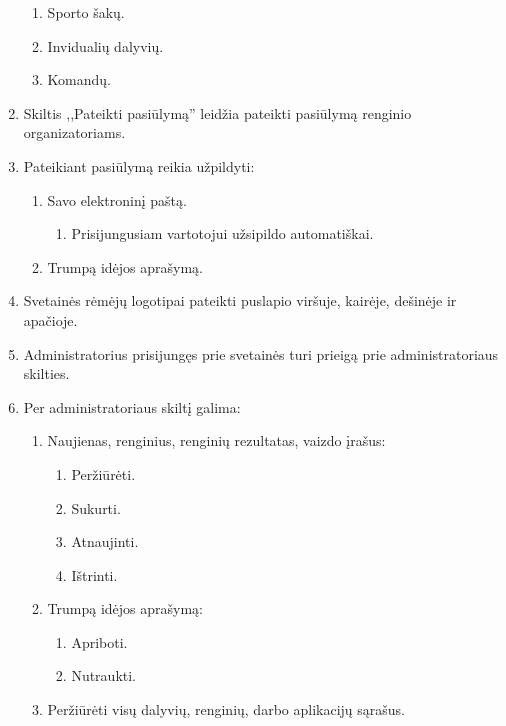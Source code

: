 \documentclass{VUMIFPSkursinis}
\begin{document}
\begin{enumerate}[label=\textbf{FR\arabic*}]
\begin{enumerate}[label*=\textbf{.\arabic*}]
						\item Sporto šakų.
						\item Invidualių dalyvių.
						\item Komandų.
					\end{enumerate}
				\item Skiltis ,,Pateikti pasiūlymą'' leidžia pateikti pasiūlymą renginio organizatoriams.
				\item Pateikiant pasiūlymą reikia užpildyti:
					\begin{enumerate}[label*=\textbf{.\arabic*}]
						\item Savo elektroninį paštą.
						    \begin{enumerate}[label*=\textbf{.\arabic*}]
						        \item Prisijungusiam vartotojui užsipildo automatiškai.
						    \end{enumerate}
						\item Trumpą idėjos aprašymą.
					\end{enumerate}
				\item Svetainės rėmėjų logotipai pateikti puslapio viršuje, kairėje, dešinėje ir apačioje.
				\item Administratorius prisijungęs prie svetainės turi prieigą prie administratoriaus skilties.
				\item Per administratoriaus skiltį galima:
					\begin{enumerate}[label*=\textbf{.\arabic*}]
						\item Naujienas, renginius, renginių rezultatas, vaizdo įrašus:
						    \begin{enumerate}[label*=\textbf{.\arabic*}]
						        \item Peržiūrėti.
						        \item Sukurti.
						        \item Atnaujinti.
						        \item Ištrinti.
						    \end{enumerate}
						\item Trumpą idėjos aprašymą:
                            \begin{enumerate}[label*=\textbf{.\arabic*}]
						        \item Apriboti.
						        \item Nutraukti.
						    \end{enumerate}
						\item Peržiūrėti visų dalyvių, renginių, darbo aplikacijų sąrašus.
					\end{enumerate}

\end{enumerate}
\end{document}
